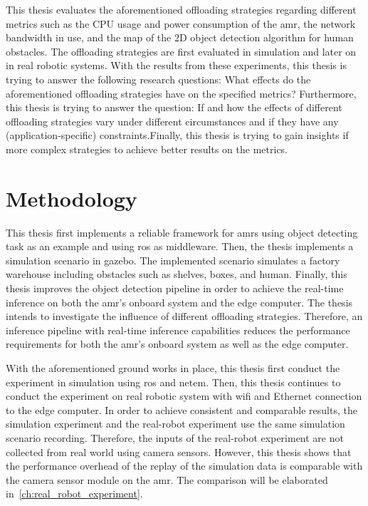 This thesis evaluates the aforementioned offloading strategies regarding different metrics such as the CPU usage and power consumption of the \gls{amr}, the network bandwidth in use, and the \gls{map} of the 2D object detection algorithm for human obstacles. The offloading strategies are first evaluated in simulation and later on in real robotic systems. With the results from these experiments, this thesis is trying to answer the following research questions: What effects do the aforementioned offloading strategies have on the specified metrics? Furthermore, this thesis is trying to answer the question: If and how the effects of different offloading strategies vary under different circumstances and if they have any (application-specific) constraints.Finally, this thesis is trying to gain insights if more complex strategies to achieve better results on the metrics. 

\section{Methodology}\label{sec:introduction:methodology}

This thesis first implements a reliable framework for \glspl{amr} using object detecting task as an example and using \gls{ros} as middleware. Then, the thesis implements a simulation scenario in \gls{gazebo}. The implemented scenario simulates a factory warehouse including obstacles such as shelves, boxes, and human. Finally, this thesis improves the object detection pipeline in order to achieve the real-time inference on both the \gls{amr}'s onboard system and the edge computer. The thesis intends to investigate the influence of different offloading strategies. Therefore, an inference pipeline with real-time inference capabilities reduces the performance requirements for both the \gls{amr}'s onboard system as well as the edge computer.

With the aforementioned ground works in place, this thesis first conduct the experiment in simulation using \gls{ros} and \gls{netem}. Then, this thesis continues to conduct the experiment on real robotic system with \gls{wifi} and Ethernet connection to the edge computer. In order to achieve consistent and comparable results, the simulation experiment and the real-robot experiment use the same simulation scenario recording. Therefore, the inputs of the real-robot experiment are not collected from real world using camera sensors. However, this thesis shows that the performance overhead of the replay of the simulation data is comparable with the camera sensor module on the \gls{amr}. The comparison will be elaborated in~\cref{ch:real_robot_experiment}. 

